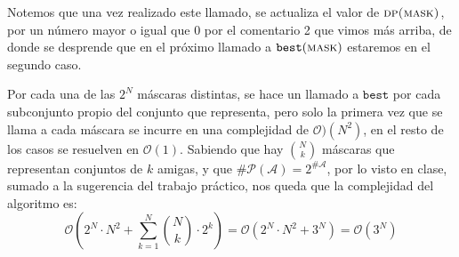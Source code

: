 	Notemos que una vez realizado este llamado, se actualiza el valor de $\textsc{dp(mask)}$, por un número mayor o igual que $0$ por el comentario 2 que vimos más arriba, de donde se desprende que en el próximo llamado a $\texttt{best}(\textsc{mask})$ estaremos en el segundo caso.	
	
	Por cada una de las $2^N$ máscaras distintas, se hace un llamado a $\texttt{best}$ por cada subconjunto propio del conjunto que representa, pero solo la primera vez que se llama a cada máscara se incurre en una complejidad de $\mathcal{O})(N^2)$, en el resto de los casos se resuelven en $\mathcal{O}(1)$. Sabiendo que hay $\binom{N}{k}$ máscaras que representan conjuntos de $k$ amigas, y que $\# \mathcal{P}(\mathcal{A}) = 2^{\# \mathcal{A}}$, por lo visto en clase, sumado a la sugerencia del trabajo práctico, nos queda que la complejidad del algoritmo es:
	$$ \mathcal{O} \left ( 2^N \cdot N^2 + \sum_{k = 1}^N \binom{N}{k} \cdot 2^k \right ) = \mathcal{O}\left (2^N \cdot N^2 + 3^N \right ) = \boxed{ \mathcal{O}(3^N)} $$